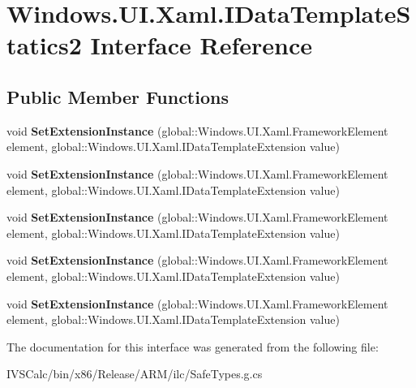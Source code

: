 \hypertarget{interface_windows_1_1_u_i_1_1_xaml_1_1_i_data_template_statics2}{}\section{Windows.\+U\+I.\+Xaml.\+I\+Data\+Template\+Statics2 Interface Reference}
\label{interface_windows_1_1_u_i_1_1_xaml_1_1_i_data_template_statics2}
\subsection*{Public Member Functions}
\begin{DoxyCompactItemize}
\item 
\mbox{\label{interface_windows_1_1_u_i_1_1_xaml_1_1_i_data_template_statics2_aa332f5dbec7a4cffba54ddc10812ae30}} 
void {\bfseries Set\+Extension\+Instance} (global\+::\+Windows.\+U\+I.\+Xaml.\+Framework\+Element element, global\+::\+Windows.\+U\+I.\+Xaml.\+I\+Data\+Template\+Extension value)
\item 
\mbox{\label{interface_windows_1_1_u_i_1_1_xaml_1_1_i_data_template_statics2_aa332f5dbec7a4cffba54ddc10812ae30}} 
void {\bfseries Set\+Extension\+Instance} (global\+::\+Windows.\+U\+I.\+Xaml.\+Framework\+Element element, global\+::\+Windows.\+U\+I.\+Xaml.\+I\+Data\+Template\+Extension value)
\item 
\mbox{\label{interface_windows_1_1_u_i_1_1_xaml_1_1_i_data_template_statics2_aa332f5dbec7a4cffba54ddc10812ae30}} 
void {\bfseries Set\+Extension\+Instance} (global\+::\+Windows.\+U\+I.\+Xaml.\+Framework\+Element element, global\+::\+Windows.\+U\+I.\+Xaml.\+I\+Data\+Template\+Extension value)
\item 
\mbox{\label{interface_windows_1_1_u_i_1_1_xaml_1_1_i_data_template_statics2_aa332f5dbec7a4cffba54ddc10812ae30}} 
void {\bfseries Set\+Extension\+Instance} (global\+::\+Windows.\+U\+I.\+Xaml.\+Framework\+Element element, global\+::\+Windows.\+U\+I.\+Xaml.\+I\+Data\+Template\+Extension value)
\item 
\mbox{\label{interface_windows_1_1_u_i_1_1_xaml_1_1_i_data_template_statics2_aa332f5dbec7a4cffba54ddc10812ae30}} 
void {\bfseries Set\+Extension\+Instance} (global\+::\+Windows.\+U\+I.\+Xaml.\+Framework\+Element element, global\+::\+Windows.\+U\+I.\+Xaml.\+I\+Data\+Template\+Extension value)
\end{DoxyCompactItemize}


The documentation for this interface was generated from the following file\+:\begin{DoxyCompactItemize}
\item 
I\+V\+S\+Calc/bin/x86/\+Release/\+A\+R\+M/ilc/Safe\+Types.\+g.\+cs\end{DoxyCompactItemize}
